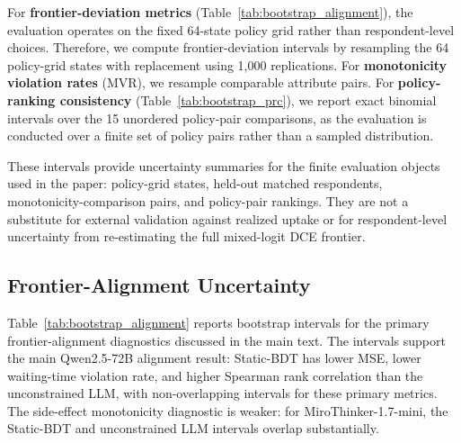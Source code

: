 \documentclass[11pt]{article}
\begin{document}
For \textbf{frontier-deviation metrics} (Table~\ref{tab:bootstrap_alignment}), the evaluation operates on the fixed 64-state policy grid rather than respondent-level choices. Therefore, we compute frontier-deviation intervals by resampling the 64 policy-grid states with replacement using 1,000 replications. For \textbf{monotonicity violation rates} (MVR), we resample comparable attribute pairs. For \textbf{policy-ranking consistency} (Table~\ref{tab:bootstrap_prc}), we report exact binomial intervals over the 15 unordered policy-pair comparisons, as the evaluation is conducted over a finite set of policy pairs rather than a sampled distribution.

These intervals provide uncertainty summaries for the finite evaluation objects used in the paper: policy-grid states, held-out matched respondents, monotonicity-comparison pairs, and policy-pair rankings. They are not a substitute for external validation against realized uptake or for respondent-level uncertainty from re-estimating the full mixed-logit DCE frontier.

\subsection{Frontier-Alignment Uncertainty}

Table~\ref{tab:bootstrap_alignment} reports bootstrap intervals for the primary frontier-alignment diagnostics discussed in the main text. The intervals support the main Qwen2.5-72B alignment result: Static-BDT has lower MSE, lower waiting-time violation rate, and higher Spearman rank correlation than the unconstrained LLM, with non-overlapping intervals for these primary metrics. The side-effect monotonicity diagnostic is weaker: for MiroThinker-1.7-mini, the Static-BDT and unconstrained LLM intervals overlap substantially.
\end{document}
